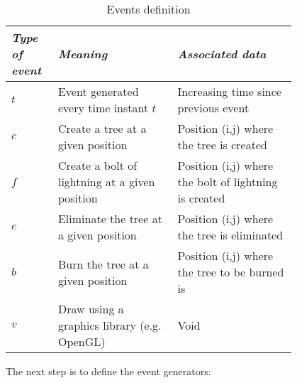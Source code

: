 \documentclass[runningheads]{llncs}
\begin{document}
\begin{table}[h]
\begin{center}
\begin{small}
\begin{tabular}{|p{0.1\linewidth}|p{0.35\linewidth}|p{0.35\linewidth}|}

    \hline
    \itshape Type of event &
    \itshape Meaning &
    \itshape Associated data\\

    \hline
    $t$ &
    Event generated every time instant $t$
    &
    Increasing time since previous event\\

    \hline
    $c$ &
    Create a tree at a given position &
    Position (i,j) where the tree is created \\

    \hline
    $f$ &
    Create a bolt of lightning at a given position &
    Position (i,j) where the bolt of lightning is created\\

    \hline
    $e$ &
    Eliminate the tree at a given position &
    Position (i,j) where the tree is eliminated\\

    \hline
    $b$ &
    Burn the tree at a given position &
    Position (i,j) where the tree to be burned is\\

    \hline
    $v$ &
    Draw using a graphics library (e.g. OpenGL) &
    Void\\

    \hline

\end{tabular}
\end{small}
\caption{\label{table1} Events definition}
\end{center}
\end{table}


The next step is to define the event generators:
\end{document}
